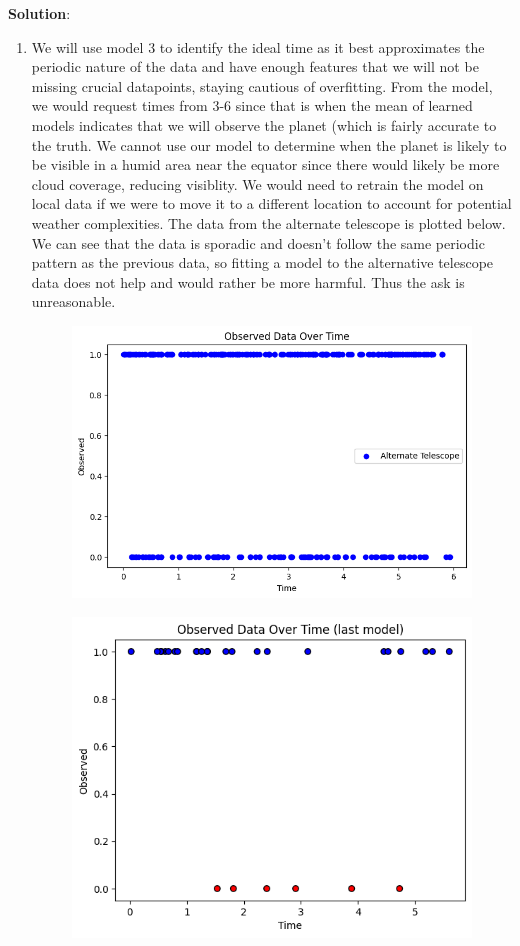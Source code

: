 \documentclass[submit]{../harvardml}
\newenvironment{solution}{
    \vspace{2mm}
    \color{blue}\noindent\textbf{Solution}:
}{}
\begin{document}
\begin{solution}
\begin{enumerate}
    \item We will use model 3 to identify the ideal time as it best approximates the periodic nature of the data and have enough features that we will not be missing crucial datapoints, staying cautious of overfitting. From the model, we would request times from 3-6 since that is when the mean of learned models indicates that we will observe the planet (which is fairly accurate to the truth. We cannot use our model to determine when the planet is likely to be visible in a humid area near the equator since there would likely be more cloud coverage, reducing visiblity. We would need to retrain the model on local data if we were to move it to a different location to account for potential weather complexities. The data from the alternate telescope is plotted below. We can see that the data is sporadic and doesn't follow the same periodic pattern as the previous data, so fitting a model to the alternative telescope data does not help and would rather be more harmful. Thus the ask is unreasonable.

    

    \begin{figure}[H]
        \centering
        \includegraphics[width=0.5\linewidth]{alternate.png}
    \end{figure}

    \begin{figure}[H]
        \centering
        \includegraphics[width=0.5\linewidth]{pelase.png}
    \end{figure}
    
\end{enumerate}

\end{solution}
\end{document}
